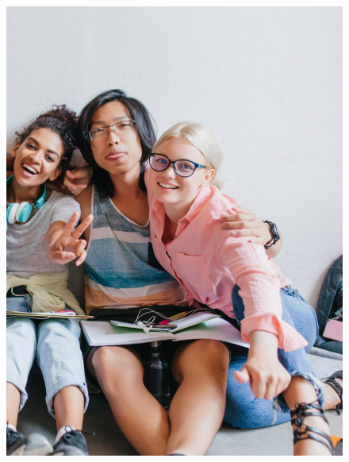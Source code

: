 \begin{figure}[htpb]
\vspace*{-2.5cm}
\hspace{-3cm}\includegraphics[height=\paperheight]{../separadores/separadorPOR9B.png}
\end{figure}




